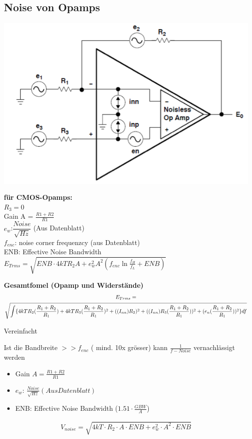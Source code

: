 \subsection{Noise von Opamps}
\begin{multicols}{2}
	\includegraphics[scale=0.4]{pictures/oampnoise}
	\columnbreak
	
	\textbf{für CMOS-Opamps:} \\
	$R_3=0$ \\
	Gain A = $\frac{R1+R2}{R1}$ \\
	$e_{w}$:$\dfrac{Noise}{\sqrt{Hz}}$ (Aus Datenblatt) \\
	$f_{enc}$: noise corner frequenzcy (aus Datenblatt) \\
	ENB: Effective Noise Bandwidth \\
	$E_{Trms}=\sqrt{ENB \cdot 4kTR_{2}A+e_{w}^2A^2(f_{enc}\ln{\frac{f_{H}}{f_{L}}}+ENB)}$
\end{multicols}

\textbf{Gesamtfomel (Opamp und Widerstände)}\\
\begin{gather*}
E_{Trms}=\notag\\\sqrt{\int
\{4kTR_{2}(\frac{R_{1}+R_{2}}{R_{1}})+4kTR_{3}(\frac{R_{1}+R_{2}}{R_{1}})^2+((I_{nn})R_{2})^2+((I_{nn})R_{3}(\frac{R_{1}+R_{2}}{R_{1}}))^2+(e_{n}(\frac{R_{1}+R_{2}}{R_{1}}))^2\}df}
\end{gather*}


Vereinfacht 


Ist die Bandbreite $>>f_{enc}$ ( mind. 10x grösser) kann $\frac{1}{f-Noise}$
vernachlässigt werden
\begin{itemize}
  \item Gain $A=\frac{R1+R2}{R1}$
  \item $e_{w}$: $\frac{Noise}{\sqrt{Hz}}(Aus Datenblatt)$
  \item ENB: Effective Noise Bandwidth ($1.51 \cdot \frac{GBW}{A}$)
\end{itemize}
\begin{gather*}
V_{noise}=\sqrt{4kT \cdot R_{2} \cdot A \cdot ENB+e_{w}^2 \cdot A^2 \cdot ENB}
\end{gather*}
